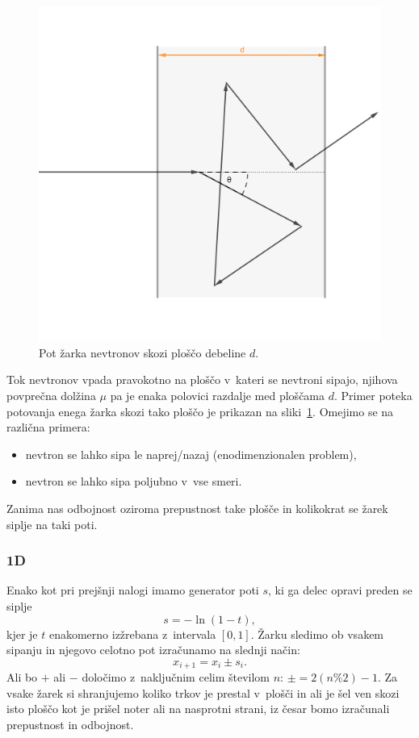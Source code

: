 \documentclass[a4paper,pdftex,10pt]{article}
\numberwithin{figure}{section} %
\begin{document}
\begin{figure}
    \centering 
    \includegraphics[width=.60\linewidth]{sipanje} 
    \caption{Pot žarka nevtronov skozi ploščo debeline $d$.}
    \label{slika7} 
\end{figure}
Tok nevtronov vpada pravokotno na ploščo v~kateri se nevtroni sipajo, njihova povprečna
dolžina $\mu$ pa je enaka polovici razdalje med ploščama $d$. Primer poteka potovanja
enega žarka skozi tako ploščo je prikazan na sliki~\ref{slika7}.
Omejimo se na različna primera:
\begin{itemize}
    \item nevtron se lahko sipa le naprej/nazaj (enodimenzionalen problem),
    \item nevtron se lahko sipa poljubno v~vse smeri.
\end{itemize}
Zanima nas odbojnost oziroma prepustnost take plošče in kolikokrat se žarek siplje na taki
poti.
\subsubsection*{1D}
Enako kot pri prejšnji nalogi imamo generator poti $s$, ki ga delec opravi preden se siplje
\begin{equation}
    s = - \ln (1-t),
\end{equation}
kjer je $t$ enakomerno izžrebana z~intervala $[0,1]$. Žarku sledimo ob vsakem sipanju
in njegovo celotno pot izračunamo na slednji način:
\begin{equation}
    x_{i+1} = x_i \pm s_i.
\end{equation}
Ali bo $+$ ali $-$ določimo z~naključnim celim številom $n$: $ \pm = 2 (n\%2) - 1$.
Za vsake žarek si shranjujemo koliko trkov je prestal v~plošči in ali je šel ven skozi
isto ploščo kot je prišel noter ali na nasprotni strani, iz česar bomo izračunali
prepustnost in odbojnost.
\end{document}
